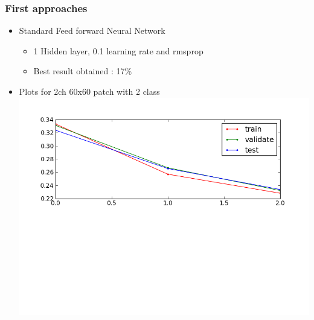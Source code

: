 \documentclass[14pt,mathserif]{beamer}
\begin{document}
\frame
{
  \frametitle{First approaches}
  \begin{itemize}
     \setlength{\itemsep}{1em}
     \item Standard  Feed forward Neural Network
      \begin{itemize}
      	\item 1 Hidden layer, 0.1 learning rate 					and rmsprop	
        	\item Best result obtained : 17\%
        	\end{itemize}
   \end{itemize}
   \begin{itemize}
     \setlength{\itemsep}{1em}
     \item Plots for 2ch 60x60 patch with 2 class 
     \includegraphics[scale=0.35]{standard_NN_2class_errors.png}     	
  	\end{itemize}
}
\end{document}
